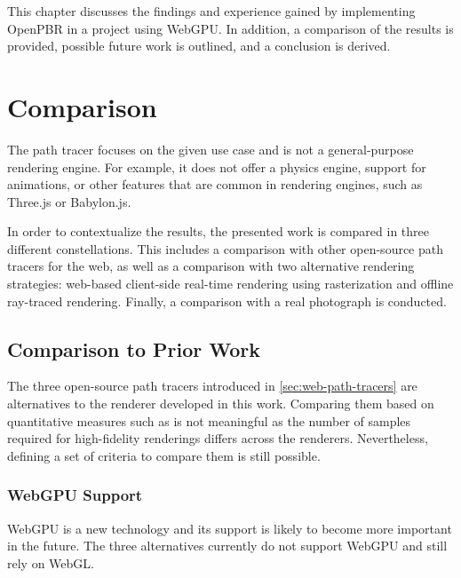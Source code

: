 
This chapter discusses the findings and experience gained by implementing \gls{OpenPBR} in a project using \gls{WebGPU}. In addition, a comparison of the results is provided, possible future work is outlined, and a conclusion is derived.

\section{Comparison}

The path tracer focuses on the given use case and is not a general-purpose rendering engine. For example, it does not offer a physics engine, support for animations, or other features that are common in rendering engines, such as \gls{Three.js} or \gls{Babylon.js}.

In order to contextualize the results, the presented work is compared in three different constellations. This includes a comparison with other open-source path tracers for the web, as well as a comparison with two alternative rendering strategies: web-based client-side real-time rendering using rasterization and offline ray-traced rendering. Finally, a comparison with a real photograph is conducted.

\subsection*{Comparison to Prior Work}
\label{sec:comparisonToPriorWork}

The three open-source path tracers introduced in \autoref{sec:web-path-tracers} are alternatives to the renderer developed in this work. Comparing them based on quantitative measures such as  is not meaningful as the number of samples required for high-fidelity renderings differs across the renderers. Nevertheless, defining a set of criteria to compare them is still possible.


\subsubsection*{WebGPU Support}

\gls{WebGPU} is a new technology and its support is likely to become more important in the future. The three alternatives currently do not support \gls{WebGPU} and still rely on \gls{WebGL}.

